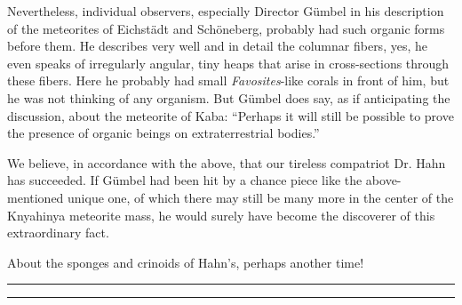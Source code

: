 \documentclass[a4paper, 12pt, oneside]{article}
\begin{document}
Nevertheless, individual observers, especially Director Gümbel in his description of the meteorites of Eichstädt and Schöneberg, probably had such organic forms before them. He describes very well and in detail the columnar fibers, yes, he even speaks of irregularly angular, tiny heaps that arise in cross-sections through these fibers. Here he probably had small \emph{Favosites}-like corals in front of him, but he was not thinking of any organism. But Gümbel does say, as if anticipating the discussion, about the meteorite of Kaba: ``Perhaps it will still be possible to prove the presence of organic beings on extraterrestrial bodies.''

We believe, in accordance with the above, that our tireless compatriot Dr. Hahn has succeeded. If Gümbel had been hit by a chance piece like the above-mentioned unique one, of which there may still be many more in the center of the Knyahinya meteorite mass, he would surely have become the discoverer of this extraordinary fact.

About the sponges and crinoids of Hahn's, perhaps another time!

\hspace*{-6mm}\rule{\textwidth}{1.6pt}\vspace*{-\baselineskip}\vspace*{2pt} %
\hspace*{0mm}\rule{\textwidth}{0.4pt} %
\end{document}
